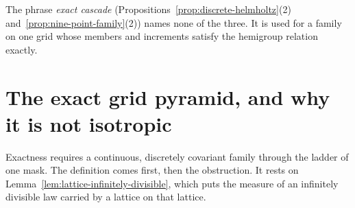 The phrase \emph{exact cascade} (Propositions~\ref{prop:discrete-helmholtz}(2)
and~\ref{prop:nine-point-family}(2)) names none of the three. It is used for a family on one grid
whose members and increments satisfy the hemigroup relation exactly.

\section{The exact grid pyramid, and why it is not isotropic}
\label{sec:price-obstruction}

Exactness requires a continuous, discretely covariant family through the ladder of one mask. The
definition comes first, then the obstruction. It rests on
Lemma~\ref{lem:lattice-infinitely-divisible}, which puts the \Levy{} measure of an infinitely
divisible law carried by a lattice on that lattice.

